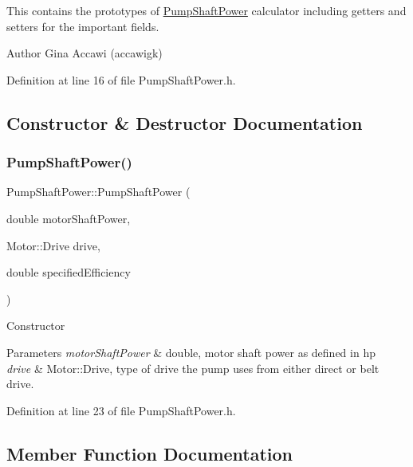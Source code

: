 This contains the prototypes of \hyperlink{class_pump_shaft_power}{Pump\+Shaft\+Power} calculator including getters and setters for the important fields.

\begin{DoxyAuthor}{Author}
Gina Accawi (accawigk) 
\end{DoxyAuthor}


Definition at line 16 of file Pump\+Shaft\+Power.\+h.



\subsection{Constructor \& Destructor Documentation}
\mbox{\label{class_pump_shaft_power_a7eea468dbb3efe1f0e8ae77a2d16efe2}} 
\subsubsection{\texorpdfstring{Pump\+Shaft\+Power()}{PumpShaftPower()}}
{\footnotesize\ttfamily Pump\+Shaft\+Power\+::\+Pump\+Shaft\+Power (\begin{DoxyParamCaption}\item[{double}]{motor\+Shaft\+Power,  }\item[{Motor\+::\+Drive}]{drive,  }\item[{double}]{specified\+Efficiency }\end{DoxyParamCaption})\hspace{0.3cm}{\ttfamily [inline]}}

Constructor 
\begin{DoxyParams}{Parameters}
{\em motor\+Shaft\+Power} & double, motor shaft power as defined in hp \\
\hline
{\em drive} & Motor\+::\+Drive, type of drive the pump uses from either direct or belt drive. \\
\hline
\end{DoxyParams}


Definition at line 23 of file Pump\+Shaft\+Power.\+h.



\subsection{Member Function Documentation}
\mbox{\label{class_pump_shaft_power_aad32bf26469a5f2984c85ba07c3f84d9}} 
